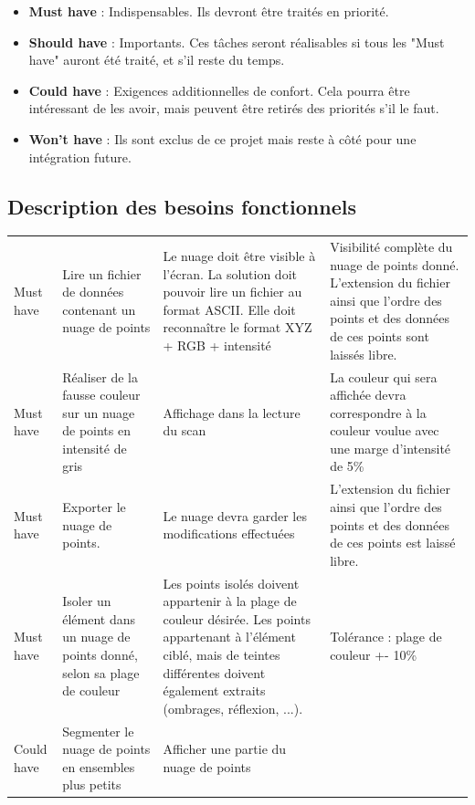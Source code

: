 \documentclass[12pt,titlepage,french]{article}
\begin{document}
\begin{itemize}
    \item \textbf{Must have} : Indispensables. Ils devront être traités en priorité.
    \item \textbf{Should have} : Importants. Ces tâches seront réalisables si tous les "Must have" auront été traité, et s'il reste du temps.
    \item \textbf{Could have} : Exigences additionnelles de confort. Cela pourra être intéressant de les avoir, mais peuvent être retirés des priorités s'il le faut.
    \item \textbf{Won't have} : Ils sont exclus de ce projet mais reste à côté pour une intégration future.
\end{itemize}

\subsection*{Description des besoins fonctionnels}

\noindent\begin{tabu} to \toprule
     &&&\\\toprule
Must have
&Lire un fichier de données contenant un nuage de points
& Le nuage doit être visible à l'écran. La solution doit pouvoir lire un fichier au format ASCII. Elle doit reconnaître le format XYZ + RGB + intensité
& Visibilité complète du nuage de points donné. L'extension du fichier ainsi que l'ordre des points et des données de ces points sont laissés libre.\\\midrule
Must have 
& Réaliser de la fausse couleur sur un nuage de points en intensité de gris
& Affichage dans la lecture du scan
& La couleur qui sera affichée devra correspondre à la couleur voulue avec une marge d'intensité de 5\%\\\midrule
Must have 
& Exporter le nuage de points.
& Le nuage devra garder les modifications effectuées
& L'extension du fichier ainsi que l'ordre des points et des données de ces points est laissé libre.\\\midrule
Must have 
&Isoler un élément dans un nuage de points donné, selon sa plage de couleur 
& Les points isolés doivent appartenir à la plage de couleur désirée.
Les points appartenant à l'élément ciblé, mais de teintes différentes doivent également extraits (ombrages, réflexion, ...).
& Tolérance : plage de couleur +- 10\% \\\midrule
Could have 
& Segmenter le nuage de points en ensembles plus petits
& Afficher une partie du nuage de points
& \\\bottomrule


\end{tabu}
\end{document}
